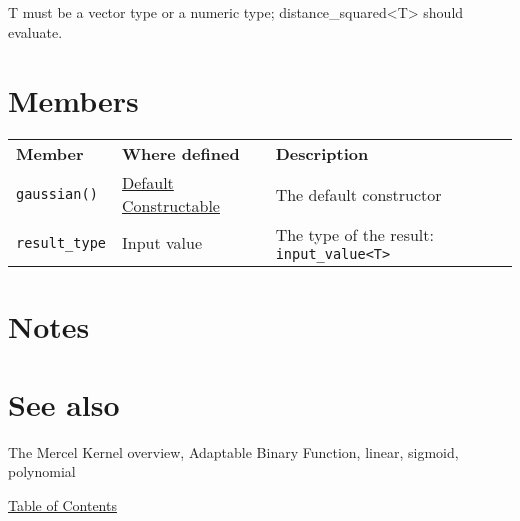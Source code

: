 \documentclass{article}
\begin{document}
T must be a vector type or a numeric type; distance_squared<T> should evaluate.


\section*{Members}

\begin{tabular}{lll}
\textbf{Member} & \textbf{Where defined} & \textbf{Description} \\ 
\texttt{gaussian()} & \href{http://www.sgi.com/tech/stl/DefaultConstructible.html}{Default Constructable} & The default constructor \\
\texttt{result_type} & Input value & The type of the result: \texttt{input_value<T>} \\
\end{tabular}

\section*{Notes}

\section*{See also}

The Mercel Kernel overview, Adaptable Binary Function, linear, sigmoid, polynomial


\noindent \href{research/kml/documentation/}{Table of Contents}



\end{document}
